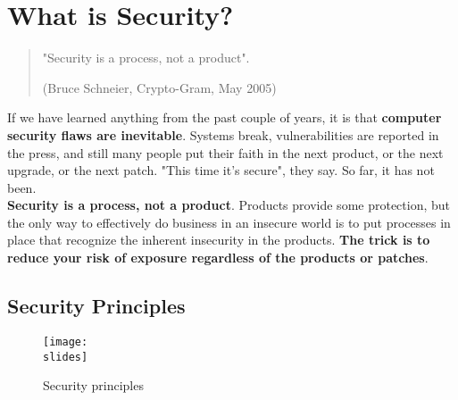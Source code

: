  {}




\section{What is Security?}
\begin{quote}
  "Security is a process, not a product".
  \begin{flushright}
    (Bruce Schneier, Crypto-Gram, May 2005)
  \end{flushright}
\end{quote}


If we have learned anything from the past couple of years, it is that \textbf{computer security flaws are inevitable}.
Systems break, vulnerabilities are reported in the press, and still many people put their faith in the next product, or the next upgrade, or the next patch. "This time it's secure", they say. So far, it has not been.\\
\textbf{Security is a process, not a product}. Products provide some protection, but the only way to effectively do business in an insecure world is to put processes in place that recognize the inherent insecurity in the products.
\textbf{The trick is to reduce your risk of exposure regardless of the products or patches}.

\subsection{Security Principles}
\begin{figure}[h]
  \centering
  \texttt{[image: \\slides]}
  \caption{Security principles}
\end{figure}

